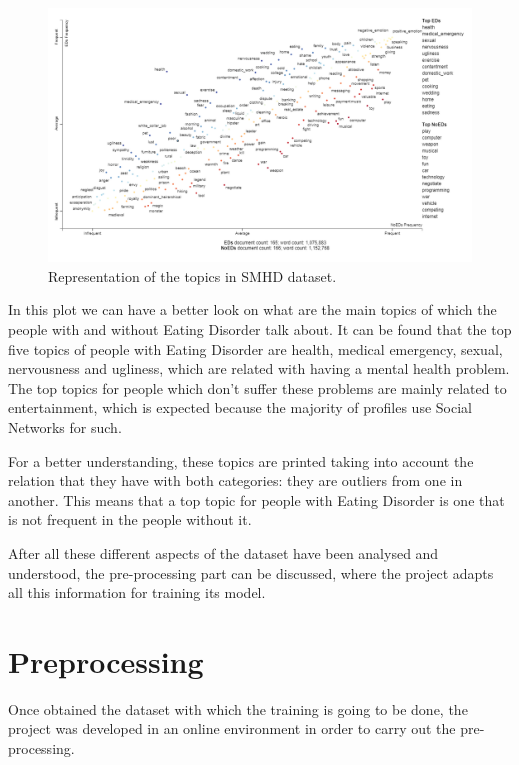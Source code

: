 \begin{figure}[!htp]
    \centering
    \includegraphics[scale=0.7]{img/detection/empath_scattertext.png}
    \caption{Representation of the topics in SMHD dataset.}
    \label{fig:empath-scattertext}
\end{figure}

In this plot we can have a better look on what are the main topics of which the people with and without Eating Disorder talk about. It can be found that the top five topics of people with Eating Disorder are health, medical emergency, sexual, nervousness and ugliness, which are related with having a mental health problem. The top topics for people which don't suffer these problems are mainly related to entertainment, which is expected because the majority of profiles use Social Networks for such.

For a better understanding, these topics are printed taking into account the relation that they have with both categories: they are outliers from one in another. This means that a top topic for people with Eating Disorder is one that is not frequent in the people without it.

After all these different aspects of the dataset have been analysed and understood, the pre-processing part can be discussed, where the project adapts all this information for training its model.

\section{Preprocessing}
\label{sec:preprocessing}
Once obtained the dataset with which the training is going to be done, the project was developed in an online environment in order to carry out the pre-processing. 

